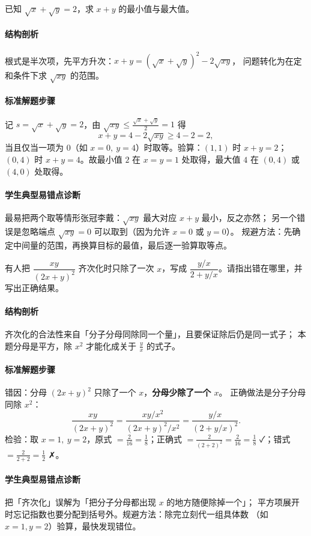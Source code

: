 \begin{problem}
已知 $\sqrt{x}+\sqrt{y}=2$，求 $x+y$ 的最小值与最大值。
\end{problem}
\begin{solution}
\paragraph{结构剖析}
根式是半次项，先平方升次：$x+y=(\sqrt x+\sqrt y)^2-2\sqrt{xy}$，
问题转化为在定和条件下求 $\sqrt{xy}$ 的范围。
\paragraph{标准解题步骤}
记 $s=\sqrt x+\sqrt y=2$，由 $\sqrt{xy}\le\frac{\sqrt x+\sqrt y}{2}=1$ 得
\[
  x+y=4-2\sqrt{xy}\ge4-2=2,
\]
当且仅当一项为 $0$（如 $x=0,\ y=4$）时取等。验算：$(1,1)$ 时 $x+y=2$；
$(0,4)$ 时 $x+y=4$。故最小值 $2$ 在 $x=y=1$ 处取得，最大值 $4$ 在
$(0,4)$ 或 $(4,0)$ 处取得。
\paragraph{学生典型易错点诊断}
最易把两个取等情形张冠李戴：$\sqrt{xy}$ 最大对应 $x+y$ 最小，反之亦然；
另一个错误是忽略端点 $\sqrt{xy}=0$ 可以取到（因为允许 $x=0$ 或 $y=0$）。
规避方法：先确定中间量的范围，再换算目标的最值，最后逐一验算取等点。
\end{solution}

\begin{problem}
有人把 $\dfrac{xy}{(2x+y)^2}$ 齐次化时只除了一次 $x$，写成 $\dfrac{y/x}{2+y/x}$。请指出错在哪里，并写出正确结果。
\end{problem}
\begin{solution}
\paragraph{结构剖析}
齐次化的合法性来自「分子分母同除同一个量」，且要保证除后仍是同一式子；
本题分母是平方，除 $x^2$ 才能化成关于 $\frac yx$ 的式子。
\paragraph{标准解题步骤}
错因：分母 $(2x+y)^2$ 只除了一个 $x$，\textbf{分母少除了一个 $x$}。
正确做法是分子分母同除 $x^2$：
\[
  \frac{xy}{(2x+y)^2}=\frac{xy/x^2}{(2x+y)^2/x^2}
  =\frac{y/x}{(2+y/x)^2}.
\]
检验：取 $x=1,\ y=2$，原式 $=\frac{2}{16}=\frac18$；正确式
$=\frac{2}{(2+2)^2}=\frac{2}{16}=\frac18$ ✓；错式 $=\frac{2}{2+2}=\frac12$ ✗。
\paragraph{学生典型易错点诊断}
把「齐次化」误解为「把分子分母都出现 $x$ 的地方随便除掉一个」；
平方项展开时忘记指数也要分配到括号外。规避方法：除完立刻代一组具体数
（如 $x=1,y=2$）验算，最快发现错位。
\end{solution}

